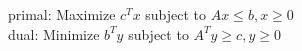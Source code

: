 primal: Maximize $c^Tx$ subject to $Ax \le b, x \geq 0$\\
dual: Minimize $b^Ty$ subject to $A^Ty \geq c, y \geq 0$\\

